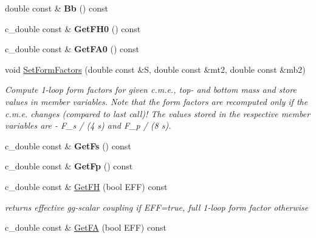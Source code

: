 \begin{DoxyCompactItemize}
\item 
\hypertarget{classHiggsBoson_ad4dc9de0ef7ca8a9c2edb8884e41bd88}{double const \& {\bfseries Bb} () const }\label{classHiggsBoson_ad4dc9de0ef7ca8a9c2edb8884e41bd88}

\item 
\hypertarget{classHiggsBoson_a89f471e351c72fcf5e95846b34727383}{c\-\_\-double const \& {\bfseries Get\-F\-H0} () const }\label{classHiggsBoson_a89f471e351c72fcf5e95846b34727383}

\item 
\hypertarget{classHiggsBoson_a2be84efb1f350882309f74db3dcc32a5}{c\-\_\-double const \& {\bfseries Get\-F\-A0} () const }\label{classHiggsBoson_a2be84efb1f350882309f74db3dcc32a5}

\item 
void \hyperlink{classHiggsBoson_a4edd830907f5f06ac24deed99e64da0c}{Set\-Form\-Factors} (double const \&S, double const \&mt2, double const \&mb2)
\begin{DoxyCompactList}\small\item\em Compute 1-\/loop form factors for given c.\-m.\-e., top-\/ and bottom mass and store values in member variables. Note that the form factors are recomputed only if the c.\-m.\-e. changes (compared to last call)! The values stored in the respective member variables are -\/ F\-\_\-s / (4 s) and F\-\_\-p / (8 s). \end{DoxyCompactList}\item 
\hypertarget{classHiggsBoson_a6e3be51e54f71ad1681485d463ba54f9}{c\-\_\-double const \& {\bfseries Get\-Fs} () const }\label{classHiggsBoson_a6e3be51e54f71ad1681485d463ba54f9}

\item 
\hypertarget{classHiggsBoson_a404990102de3ee3cd1f65a53f0759d76}{c\-\_\-double const \& {\bfseries Get\-Fp} () const }\label{classHiggsBoson_a404990102de3ee3cd1f65a53f0759d76}

\item 
\hypertarget{classHiggsBoson_af9055e140206943efe94b55ea76c1632}{c\-\_\-double const \& \hyperlink{classHiggsBoson_af9055e140206943efe94b55ea76c1632}{Get\-F\-H} (bool E\-F\-F) const }\label{classHiggsBoson_af9055e140206943efe94b55ea76c1632}

\begin{DoxyCompactList}\small\item\em returns effective gg-\/scalar coupling if E\-F\-F=true, full 1-\/loop form factor otherwise \end{DoxyCompactList}\item 
\hypertarget{classHiggsBoson_a8af3de930fb155b566956ab7c0457e29}{c\-\_\-double const \& \hyperlink{classHiggsBoson_a8af3de930fb155b566956ab7c0457e29}{Get\-F\-A} (bool E\-F\-F) const }\label{classHiggsBoson_a8af3de930fb155b566956ab7c0457e29}


\end{DoxyCompactItemize}
